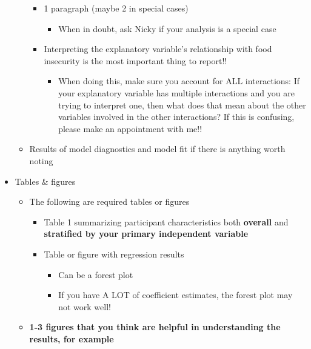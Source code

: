 \documentclass[
  letterpaper,
  DIV=11,
  numbers=noendperiod]{scrartcl}
\providecommand{\tightlist}{%
  \setlength{\itemsep}{0pt}\setlength{\parskip}{0pt}}\usepackage{longtable,booktabs,array}
\begin{document}
\begin{itemize}
\begin{itemize}
    \begin{itemize}
    \tightlist
    \item
      1 paragraph (maybe 2 in special cases)

      \begin{itemize}
      \tightlist
      \item
        When in doubt, ask Nicky if your analysis is a special case
      \end{itemize}
    \item
      Interpreting the explanatory variable's relationship with food
      insecurity is the most important thing to report!!

      \begin{itemize}
      \tightlist
      \item
        When doing this, make sure you account for ALL interactions: If
        your explanatory variable has multiple interactions and you are
        trying to interpret one, then what does that mean about the
        other variables involved in the other interactions? If this is
        confusing, please make an appointment with me!!
      \end{itemize}
    \end{itemize}
  \item
    Results of model diagnostics and model fit if there is anything
    worth noting
  \end{itemize}
\item
  Tables \& figures

  \begin{itemize}
  \tightlist
  \item
    The following are required tables or figures

    \begin{itemize}
    \tightlist
    \item
      Table 1 summarizing participant characteristics both
      \textbf{overall} and \textbf{stratified by your primary
      independent variable}
    \item
      Table or figure with regression results

      \begin{itemize}
      \tightlist
      \item
        Can be a forest plot
      \item
        If you have A LOT of coefficient estimates, the forest plot may
        not work well!
      \end{itemize}
    \end{itemize}
  \item
    \textbf{1-3 figures that you think are helpful in understanding the
    results, for example}


\end{itemize}
\end{itemize}
\end{document}
